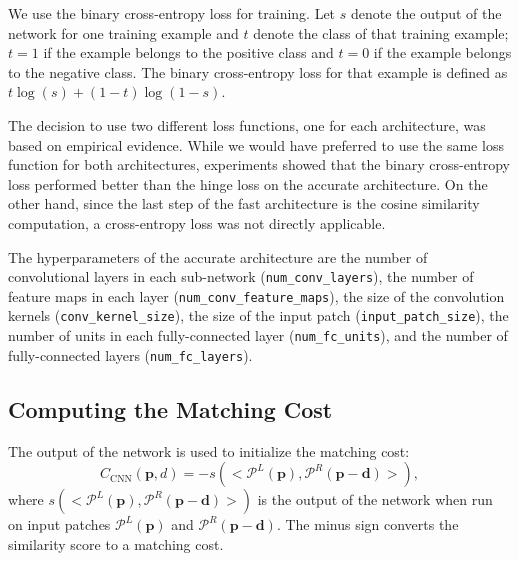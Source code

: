 \documentclass[twoside,11pt]{article}
\begin{document}
We use the binary cross-entropy loss for training.  Let $s$ denote the output of
the network for one training example and $t$ denote the class of that
training example; $t=1$ if the example belongs to the positive class and $t=0$
if the example belongs to the negative class. The binary cross-entropy loss for
that example is defined as $t\log(s) + (1 - t)\log(1 - s)$.

The decision to use two different loss functions, one for each architecture,
was based on empirical evidence. While we would have preferred to use the same
loss function for both architectures, experiments showed that the binary
cross-entropy loss performed better than the hinge loss on the accurate
architecture. On the other hand, since the last step of the fast architecture
is the cosine similarity computation, a cross-entropy loss was not directly
applicable.

The hyperparameters of the accurate architecture are
the number of convolutional layers in each sub-network (\texttt{num\_conv\_layers}), 
the number of feature maps in each layer (\texttt{num\_conv\_feature\_maps}), 
the size of the convolution kernels (\texttt{conv\_kernel\_size}), 
the size of the input patch (\texttt{input\_patch\_size}), 
the number of units in each fully-connected layer (\texttt{num\_fc\_units}),
and the number of fully-connected layers (\texttt{num\_fc\_layers}). 

\subsection{Computing the Matching Cost}
\label{sec:matching_cost}

The output of the network is used to initialize the matching cost:
%
\begin{equation*}
C_{\text{CNN}}(\mathbf{p}, d) = -s(<\mathcal{P}^L(\mathbf{p}), \mathcal{P}^R(\mathbf{p}-\mathbf{d})>),
\end{equation*}
%
where $s(<\mathcal{P}^L(\mathbf{p}), \mathcal{P}^R(\mathbf{p}-\mathbf{d})>)$ is the
output of the network when run on input patches $\mathcal{P}^L(\mathbf{p})$ and
$\mathcal{P}^R(\mathbf{p}-\mathbf{d})$. The minus sign converts the similarity score to a
matching cost. 
\end{document}
